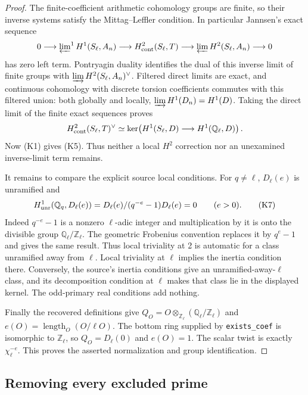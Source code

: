 \begin{proof}
The finite-coefficient arithmetic cohomology groups are finite,
so their inverse systems satisfy the Mittag--Leffler condition.
In particular Jannsen's exact sequence
\cite[(3.1)]{Jannsen1988}
\[
 0\longrightarrow\varprojlim\nolimits^1 H^1(S_\ell,A_n)
 \longrightarrow H^2_{\rm cont}(S_\ell,T)
 \longrightarrow\varprojlim H^2(S_\ell,A_n)
 \longrightarrow0
\]
has zero left term. Pontryagin duality identifies the dual of
this inverse limit of finite groups with
\(\varinjlim H^2(S_\ell,A_n)^\vee\).
Filtered direct limits are exact, and continuous cohomology
with discrete torsion coefficients commutes with this filtered
union: both globally and locally,
\(\varinjlim H^1(D_n)=H^1(D)\).
Taking the direct limit of the finite exact sequences proves
\[
 H^2_{\rm cont}(S_\ell,T)^\vee
 \simeq\ker\!\left(H^1(S_\ell,D)
                   \longrightarrow H^1(\mathbb Q_\ell,D)\right).
\]
Now (K1) gives (K5). Thus neither a local \(H^2\) correction
nor an unexamined inverse-limit term remains.

It remains to compare the explicit source local conditions.
For \(q\ne\ell\), \(D_\ell(e)\) is unramified and
\[
 H^1_{\rm unr}(\mathbb Q_q,D_\ell(e))
 =D_\ell(e)/(q^{-e}-1)D_\ell(e)=0 \qquad(e>0).         \tag{K7}
\]
Indeed \(q^{-e}-1\) is a nonzero \(\ell\)-adic integer and
multiplication by it is onto the divisible group
\(\mathbb Q_\ell/\mathbb Z_\ell\).
The geometric Frobenius convention replaces it by \(q^e-1\)
and gives the same result. Thus local triviality at 2 is
automatic for a class unramified away from \(\ell\).
Local triviality at \(\ell\) implies the inertia condition there.
Conversely, the source's inertia conditions give an
unramified-away-\(\ell\) class, and its decomposition condition
at \(\ell\) makes that class lie in the displayed kernel.
The odd-primary real conditions add nothing.

Finally the recovered definitions give
\(Q_O=O\otimes_{\mathbb Z_\ell}
(\mathbb Q_\ell/\mathbb Z_\ell)\) and
\(e(O)=\operatorname{length}_O(O/\ell O)\).
The bottom ring supplied by \texttt{exists\_coef} is isomorphic
to \(\mathbb Z_\ell\), so \(Q_O=D_\ell(0)\) and \(e(O)=1\).
The scalar twist is exactly \(\chi_\ell^{-e}\).
This proves the asserted normalization and group identification.
\end{proof}

\subsection{Removing every excluded prime}


